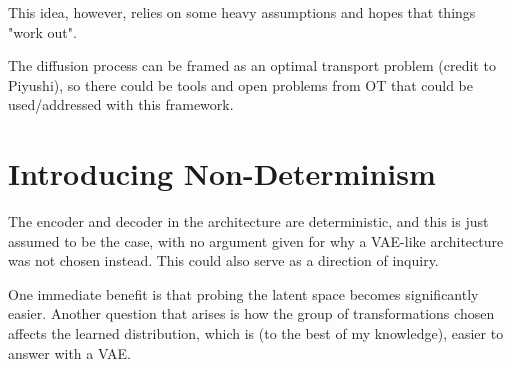 \documentclass{article}
\begin{document}
This idea, however, relies on some heavy assumptions and hopes that things "work out".

The diffusion process can be framed as an optimal transport problem (credit to Piyushi), so there could be tools and open problems from OT that could be used/addressed with this framework.

\section{Introducing Non-Determinism}
The encoder and decoder in the architecture are deterministic, and this is just assumed to be the case, with no argument given for why a VAE-like architecture was not chosen instead. This could also serve as a direction of inquiry. 

One immediate benefit is that probing the latent space becomes significantly easier. Another question that arises is how the group of transformations chosen affects the learned distribution, which is (to the best of my knowledge), easier to answer with a VAE.
\end{document}
